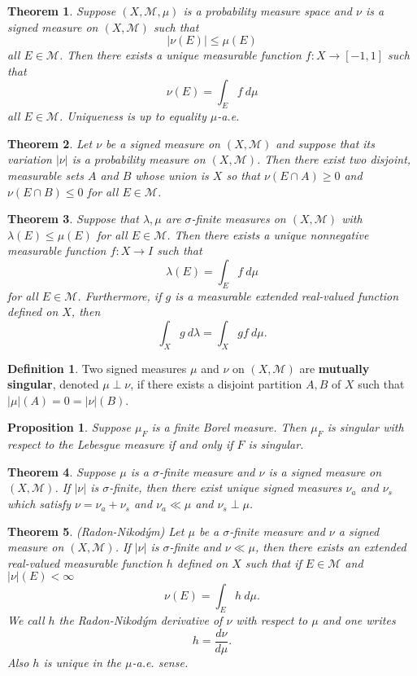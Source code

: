 \documentclass[11pt]{amsart}
\newtheorem*{theorem*}{Theorem}
\newtheorem*{proposition*}{Proposition}
\theoremstyle{definition}
\newtheorem*{definition*}{Definition}
\renewcommand\geq{\geqslant}
\renewcommand\leq{\leqslant}
\renewcommand\:{\colon}
\newcommand{\calM}{\mathcal{M}}
\newcommand{\dl}{\ d\lambda}
\newcommand{\dmu}{\ d\mu}
\begin{document}
\begin{theorem*}
	Suppose $(X, \calM, \mu)$ is a probability measure space and $\nu$ is a signed measure on $(X,\calM)$ such that 
		\[ |\nu(E)| \leq \mu(E) \]
	all $E \in \calM$. Then there exists a unique measurable function $f\: X \to [-1, 1]$ such that 
		\[ \nu(E) = \int_E f \dmu \]
	all $E \in \calM$. Uniqueness is up to equality $\mu$-a.e.
\end{theorem*}

\begin{theorem*}
	Let $\nu$ be a signed measure on $(X, \calM)$ and suppose that its variation $|\nu|$ is a probability measure on $(X, \calM)$. Then there exist two disjoint, measurable sets $A$ and $B$ whose union is $X$ so that $\nu(E \cap A) \geq 0$ and $\nu(E \cap B) \leq 0$ for all $E \in \calM$.
\end{theorem*}

\begin{theorem*}
	Suppose that $\lambda, \mu$ are $\sigma$-finite measures on $(X, \calM)$ with $\lambda(E) \leq \mu(E)$ for all $E \in \calM$. Then there exists a unique nonnegative measurable function $f\: X \to I$ such that 
		\[ \lambda(E) = \int_E f \dmu \]
	for all $E \in \calM$. Furthermore, if $g$ is a measurable extended real-valued function defined on $X$, then 
		\[ \int_X g \dl = \int_X gf \dmu. \]
\end{theorem*}

\begin{definition*}
	Two signed measures $\mu$ and $\nu$ on $(X, \calM)$ are \textbf{mutually singular}, denoted $\mu \perp \nu$, if there exists a disjoint partition $A, B$ of $X$ such that $|\mu|(A) = 0 = |\nu|(B)$.
\end{definition*}

\begin{proposition*}
	Suppose $\mu_F$ is a finite Borel measure. Then $\mu_F$ is singular with respect to the Lebesgue measure if and only if $F$ is singular.
\end{proposition*}

\begin{theorem*}
	Suppose $\mu$ is a $\sigma$-finite measure and $\nu$ is a signed measure on $(X, \calM)$. If $|\nu|$ is $\sigma$-finite, then there exist unique signed measures $\nu_a$ and $\nu_s$ which satisfy $\nu = \nu_a + \nu_s$ and  $\nu_a \ll \mu$ and $\nu_s \perp \mu$.
\end{theorem*}

\begin{theorem*}
	\textnormal{(Radon-Nikod\'ym)} Let $\mu$ be a $\sigma$-finite measure and $\nu$ a signed measure on $(X, \calM)$. If $|\nu|$ is $\sigma$-finite and $\nu \ll \mu$, then there exists an extended real-valued measurable function $h$ defined on $X$ such that if $E \in \calM$ and $|\nu|(E) < \infty$ 
		\[ \nu(E) = \int_E h \dmu. \]
	We call $h$ the Radon-Nikod\'ym derivative of $\nu$ with respect to $\mu$ and one writes	
		\[ h = \frac{d\nu}{d\mu}. \]
	Also $h$ is unique in the $\mu$-a.e. sense.
\end{theorem*}
\vskip20pt
\end{document}
